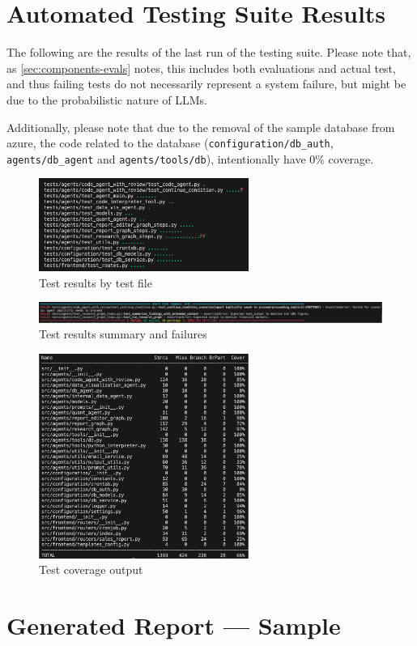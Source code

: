 \documentclass[a4paper]{report}
\begin{document}
\chapter{Automated Testing Suite Results}
\label{annex:test-results}

The following are the results of the last run of the testing suite. Please note that, as \autoref{sec:components-evals} notes, this includes both evaluations and actual test, and thus failing tests do not necessarily represent a system failure, but might be due to the probabilistic nature of LLMs.

Additionally, please note that due to the removal of the sample database from azure, the code related to the database (\texttt{configuration/db\_auth}, \texttt{agents/db\_agent} and \texttt{agents/tools/db}), intentionally have 0\% coverage.

\begin{figure}[H]
\centering
\includegraphics[width=0.61\textwidth]{images/test-results.png}
\caption{Test results by test file}
\end{figure}

\begin{figure}[H]
\centering
\includegraphics[width=1\textwidth]{images/test-results-bottom.png}
\caption{Test results summary and failures}
\end{figure}

\begin{figure}[H]
\centering
\includegraphics[width=0.61\textwidth]{images/test-coverage.png}
\caption{Test coverage output}
\end{figure}

\chapter{Generated Report --- Sample}
\end{document}
